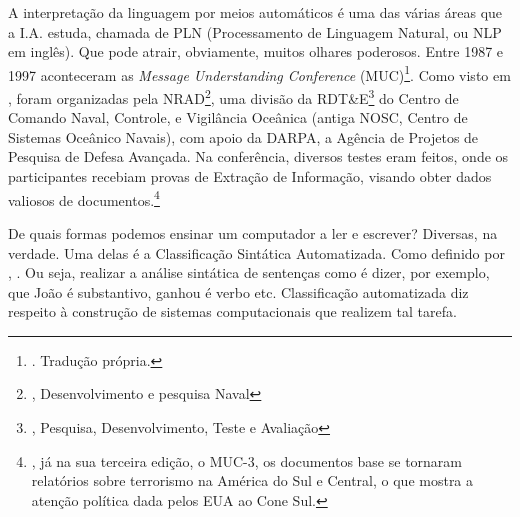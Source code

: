 A interpretação da linguagem por meios automáticos é uma das várias áreas que a I.A. estuda, chamada de PLN (Processamento de Linguagem Natural, ou NLP em inglês). Que pode atrair, obviamente, muitos olhares poderosos. Entre 1987 e 1997 aconteceram as \textit{Message Understanding Conference} (MUC)\footnote{. Tradução própria.}. Como visto em , foram organizadas pela NRAD\footnote{, Desenvolvimento e pesquisa Naval}, uma divisão da RDT\&E\footnote{, Pesquisa, Desenvolvimento, Teste e Avaliação} do Centro de Comando Naval, Controle, e Vigilância Oceânica (antiga NOSC, Centro de Sistemas Oceânico Navais), com apoio da DARPA, a Agência de Projetos de Pesquisa de Defesa Avançada. Na conferência, diversos testes eram feitos, onde os participantes recebiam provas de Extração de Informação, visando obter dados valiosos de documentos.\footnote{, já na sua terceira edição, o MUC-3, os documentos base se tornaram relatórios sobre terrorismo na América do Sul e Central, o que mostra a atenção política dada pelos EUA ao Cone Sul.}

De quais formas podemos ensinar um computador a ler e escrever? Diversas, na verdade. Uma delas é a Classificação Sintática Automatizada. Como definido por , .
Ou seja, realizar a análise sintática de sentenças como  é dizer, por exemplo, que João é substantivo, ganhou é verbo etc. Classificação automatizada diz respeito à construção de sistemas computacionais que realizem tal tarefa.

